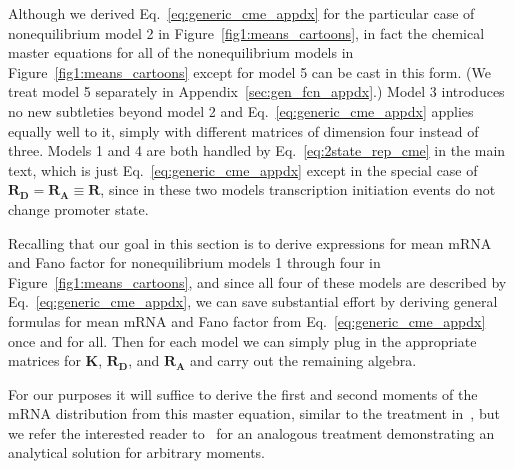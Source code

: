 Although we derived Eq.~\ref{eq:generic_cme_appdx} for the particular case of
nonequilibrium model 2 in Figure~\ref{fig1:means_cartoons}, in fact the
chemical master equations for all of the nonequilibrium models in
Figure~\ref{fig1:means_cartoons} except for model 5 can be cast in this form.
(We treat model 5 separately in Appendix~\ref{sec:gen_fcn_appdx}.) Model
3 introduces no new subtleties beyond model 2 and
Eq.~\ref{eq:generic_cme_appdx} applies equally well to it, simply with different
matrices of dimension four instead of three. Models 1 and 4 are both
handled by Eq.~\ref{eq:2state_rep_cme} in the main text, which is just
Eq.~\ref{eq:generic_cme_appdx} except in the special case of $\mathbf{R_D} =
\mathbf{R_A} \equiv \mathbf{R}$, since in these two models transcription
initiation events do not change promoter state.

Recalling that our goal in this section is to derive expressions for mean mRNA
and Fano factor for nonequilibrium models 1 through four in
Figure~\ref{fig1:means_cartoons}, and since all four of these models are
described by Eq.~\ref{eq:generic_cme_appdx}, we can save substantial effort by
deriving general formulas for mean mRNA and Fano factor from
Eq.~\ref{eq:generic_cme_appdx} once and for all. Then for each model we can
simply plug in the appropriate matrices for $\mathbf{K}$, $\mathbf{R_D}$, and
$\mathbf{R_A}$ and carry out the remaining algebra.

For our purposes it will suffice to derive the first and second moments of the
mRNA distribution from this master equation, similar to the treatment
in~\cite{Sanchez2011}, but we refer the interested reader
to~\cite{Razo-Mejia2020} for an analogous treatment demonstrating an analytical
solution for arbitrary moments.

